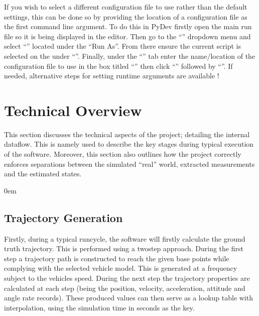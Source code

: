 \documentclass[letterpaper,10pt,english]{sphinxmanual}
\let\sphinxpxdimen\pdfpxdimen\else\newdimen\sphinxpxdimen
\begin{document}
\sphinxAtStartPar
If you wish to select a different configuration file to use rather than the default settings, this can be done so by
providing the location of a configuration file as the first command line argument. To do this in PyDev firstly open the
main run file  so it is being displayed in the editor. Then go to the “” dropdown menu and select
“” located under the “Run As”. From there ensure the current script is selected
on the  under “”. Finally, under the “” tab enter the name/location of the
configuration file to use in the box titled “” then click “” followed by “”.
If needed, alternative steps for setting runtime arguments are available
!

\sphinxstepscope


\section{Technical Overview}
\label{\detokenize{usage/technical:technical-overview}}\label{\detokenize{usage/technical::doc}}
\sphinxAtStartPar
This section discusses the technical aspects of the project; detailing the internal dataflow. This is namely used to
describe the key stages during typical execution of the software. Moreover, this section also outlines how the project
correctly enforces separations between the simulated “real” world, extracted measurements and the estimated states.

\noindent{\hspace*{\fill}\sphinxincludegraphics[width=500\sphinxpxdimen]{{sim_meas_est}.png}\hspace*{\fill}}

\begin{DUlineblock}{0em}
\item[] 
\end{DUlineblock}


\subsection{Trajectory Generation}
\label{\detokenize{usage/technical:trajectory-generation}}
\sphinxAtStartPar
Firstly, during a typical run\sphinxhyphen{}cycle, the software will firstly calculate the ground truth trajectory. This is performed
using a two\sphinxhyphen{}step approach. During the first step a trajectory path is constructed to reach the given base points while
complying with the selected vehicle model. This is generated at a frequency subject to the vehicles speed. During the
next step the trajectory properties are calculated at each step (being the position, velocity, acceleration,
attitude and angle rate records). These produced values can then serve as a look\sphinxhyphen{}up table with interpolation,
using the simulation time in seconds as the key.
\end{document}
